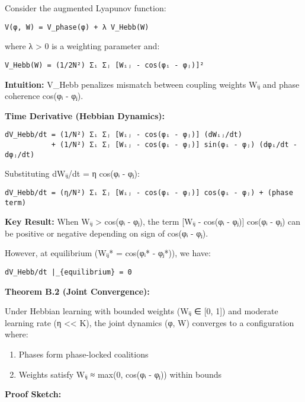 \documentclass[
]{article}
\providecommand{\tightlist}{%
  \setlength{\itemsep}{0pt}\setlength{\parskip}{0pt}}
\begin{document}
Consider the augmented Lyapunov function:

\begin{verbatim}
V(φ, W) = V_phase(φ) + λ V_Hebb(W)
\end{verbatim}

where λ \textgreater{} 0 is a weighting parameter and:

\begin{verbatim}
V_Hebb(W) = (1/2N²) Σᵢ Σⱼ [Wᵢⱼ - cos(φᵢ - φⱼ)]²
\end{verbatim}

\textbf{Intuition:} V\_Hebb penalizes mismatch between coupling weights
Wᵢⱼ and phase coherence cos(φᵢ - φⱼ).

\textbf{Time Derivative (Hebbian Dynamics):}

\begin{verbatim}
dV_Hebb/dt = (1/N²) Σᵢ Σⱼ [Wᵢⱼ - cos(φᵢ - φⱼ)] (dWᵢⱼ/dt)
           + (1/N²) Σᵢ Σⱼ [Wᵢⱼ - cos(φᵢ - φⱼ)] sin(φᵢ - φⱼ) (dφᵢ/dt - dφⱼ/dt)
\end{verbatim}

Substituting dWᵢⱼ/dt = η cos(φᵢ - φⱼ):

\begin{verbatim}
dV_Hebb/dt = (η/N²) Σᵢ Σⱼ [Wᵢⱼ - cos(φᵢ - φⱼ)] cos(φᵢ - φⱼ) + (phase term)
\end{verbatim}

\textbf{Key Result:} When Wᵢⱼ \textgreater{} cos(φᵢ - φⱼ), the term
{[}Wᵢⱼ - cos(φᵢ - φⱼ){]} cos(φᵢ - φⱼ) can be positive or negative
depending on sign of cos(φᵢ - φⱼ).

However, at equilibrium (Wᵢⱼ* = cos(φᵢ* - φⱼ*)), we have:

\begin{verbatim}
dV_Hebb/dt |_{equilibrium} = 0
\end{verbatim}

\textbf{Theorem B.2 (Joint Convergence):}

Under Hebbian learning with bounded weights (Wᵢⱼ ∈ {[}0, 1{]}) and
moderate learning rate (η \textless\textless{} K), the joint dynamics
(φ, W) converges to a configuration where:

\begin{enumerate}
\def\labelenumi{\arabic{enumi}.}
\tightlist
\item
  Phases form phase-locked coalitions
\item
  Weights satisfy Wᵢⱼ ≈ max(0, cos(φᵢ - φⱼ)) within bounds
\end{enumerate}

\textbf{Proof Sketch:}
\end{document}
